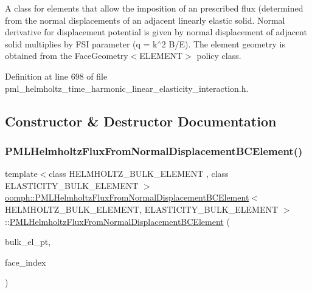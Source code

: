 A class for elements that allow the imposition of an prescribed flux (determined from the normal displacements of an adjacent linearly elastic solid. Normal derivative for displacement potential is given by normal displacement of adjacent solid multiplies by F\+SI parameter (q = k$^\wedge$2 B/E). The element geometry is obtained from the Face\+Geometry$<$\+E\+L\+E\+M\+E\+N\+T$>$ policy class. 

Definition at line 698 of file pml\+\_\+helmholtz\+\_\+time\+\_\+harmonic\+\_\+linear\+\_\+elasticity\+\_\+interaction.\+h.



\subsection{Constructor \& Destructor Documentation}
\mbox{\label{classoomph_1_1PMLHelmholtzFluxFromNormalDisplacementBCElement_abd57422005608f9ddfccefa73e6d757c}} 
\subsubsection{\texorpdfstring{P\+M\+L\+Helmholtz\+Flux\+From\+Normal\+Displacement\+B\+C\+Element()}{PMLHelmholtzFluxFromNormalDisplacementBCElement()}\hspace{0.1cm}{\footnotesize\ttfamily [1/2]}}
{\footnotesize\ttfamily template$<$class H\+E\+L\+M\+H\+O\+L\+T\+Z\+\_\+\+B\+U\+L\+K\+\_\+\+E\+L\+E\+M\+E\+NT , class E\+L\+A\+S\+T\+I\+C\+I\+T\+Y\+\_\+\+B\+U\+L\+K\+\_\+\+E\+L\+E\+M\+E\+NT $>$ \\
\hyperlink{classoomph_1_1PMLHelmholtzFluxFromNormalDisplacementBCElement}{oomph\+::\+P\+M\+L\+Helmholtz\+Flux\+From\+Normal\+Displacement\+B\+C\+Element}$<$ H\+E\+L\+M\+H\+O\+L\+T\+Z\+\_\+\+B\+U\+L\+K\+\_\+\+E\+L\+E\+M\+E\+NT, E\+L\+A\+S\+T\+I\+C\+I\+T\+Y\+\_\+\+B\+U\+L\+K\+\_\+\+E\+L\+E\+M\+E\+NT $>$\+::\hyperlink{classoomph_1_1PMLHelmholtzFluxFromNormalDisplacementBCElement}{P\+M\+L\+Helmholtz\+Flux\+From\+Normal\+Displacement\+B\+C\+Element} (\begin{DoxyParamCaption}\item[{Finite\+Element $\ast$const \&}]{bulk\+\_\+el\+\_\+pt,  }\item[{const int \&}]{face\+\_\+index }\end{DoxyParamCaption})}



